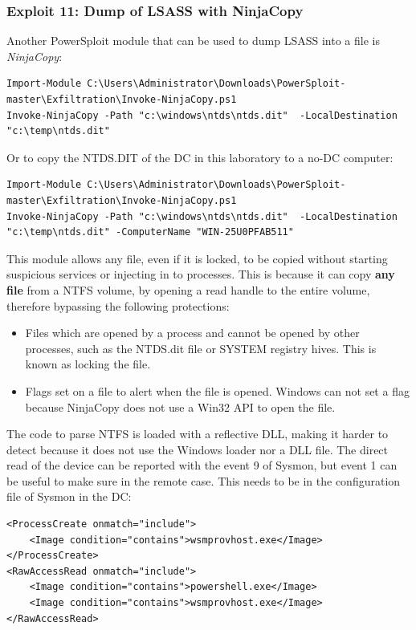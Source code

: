 \subsubsection{Exploit 11: Dump of LSASS with NinjaCopy}
Another PowerSploit module that can be used to dump LSASS into a file is \textit{NinjaCopy}:
\begin{lstlisting}[style=PS]
Import-Module C:\Users\Administrator\Downloads\PowerSploit-master\Exfiltration\Invoke-NinjaCopy.ps1
Invoke-NinjaCopy -Path "c:\windows\ntds\ntds.dit"  -LocalDestination "c:\temp\ntds.dit"
\end{lstlisting}
\linej
Or to copy the NTDS.DIT of the DC in this laboratory to a no-DC computer:
\begin{lstlisting}[style=PS]
Import-Module C:\Users\Administrator\Downloads\PowerSploit-master\Exfiltration\Invoke-NinjaCopy.ps1
Invoke-NinjaCopy -Path "c:\windows\ntds\ntds.dit"  -LocalDestination "c:\temp\ntds.dit" -ComputerName "WIN-25U0PFAB511"
\end{lstlisting}
\linej
This module allows any file, even if it is locked, to be copied without starting suspicious services or injecting in to processes. This is because it can copy \textbf{any file} from a NTFS volume, by opening a read handle to the entire volume, therefore bypassing the following protections\cite{dump_ways}:
\begin{itemize}
	\item Files which are opened by a process and cannot be opened by other processes, such as the NTDS.dit file or SYSTEM registry hives. This is known as locking the file.
	\item Flags set on a file to alert when the file is opened. Windows can not set a flag because NinjaCopy does not use a Win32 API to open the file.
\end{itemize}
\linej
The code to parse NTFS is loaded with a reflective DLL, making it harder to detect because it does not use the Windows loader nor a DLL file.
\linej
The direct read of the device can be reported with the event 9 of Sysmon, but event 1 can be useful to make sure in the remote case. This needs to be in the configuration file of Sysmon in the DC:
\begin{lstlisting}[style=xml]
<ProcessCreate onmatch="include">
	<Image condition="contains">wsmprovhost.exe</Image>
</ProcessCreate>
<RawAccessRead onmatch="include">
	<Image condition="contains">powershell.exe</Image>
	<Image condition="contains">wsmprovhost.exe</Image>
</RawAccessRead>
\end{lstlisting}
